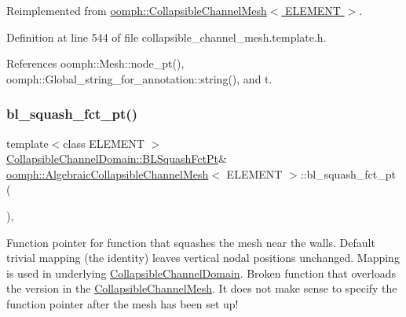 Reimplemented from \hyperlink{classoomph_1_1CollapsibleChannelMesh_ac7913dca6b8b11240caede54414f3c11}{oomph\+::\+Collapsible\+Channel\+Mesh$<$ E\+L\+E\+M\+E\+N\+T $>$}.



Definition at line 544 of file collapsible\+\_\+channel\+\_\+mesh.\+template.\+h.



References oomph\+::\+Mesh\+::node\+\_\+pt(), oomph\+::\+Global\+\_\+string\+\_\+for\+\_\+annotation\+::string(), and t.

\mbox{\label{classoomph_1_1AlgebraicCollapsibleChannelMesh_abf1848b49f57419af4379a637464587d}} 
\subsubsection{\texorpdfstring{bl\+\_\+squash\+\_\+fct\+\_\+pt()}{bl\_squash\_fct\_pt()}}
{\footnotesize\ttfamily template$<$class E\+L\+E\+M\+E\+NT $>$ \\
\hyperlink{classoomph_1_1CollapsibleChannelDomain_a2bf1d7943bfac134a5c27a54c7e1faed}{Collapsible\+Channel\+Domain\+::\+B\+L\+Squash\+Fct\+Pt}\& \hyperlink{classoomph_1_1AlgebraicCollapsibleChannelMesh}{oomph\+::\+Algebraic\+Collapsible\+Channel\+Mesh}$<$ E\+L\+E\+M\+E\+NT $>$\+::bl\+\_\+squash\+\_\+fct\+\_\+pt (\begin{DoxyParamCaption}{ }\end{DoxyParamCaption})\hspace{0.3cm}{\ttfamily [inline]}, {\ttfamily [virtual]}}



Function pointer for function that squashes the mesh near the walls. Default trivial mapping (the identity) leaves vertical nodal positions unchanged. Mapping is used in underlying \hyperlink{classoomph_1_1CollapsibleChannelDomain}{Collapsible\+Channel\+Domain}. Broken function that overloads the version in the \hyperlink{classoomph_1_1CollapsibleChannelMesh}{Collapsible\+Channel\+Mesh}. It does not make sense to specify the function pointer after the mesh has been set up! 



